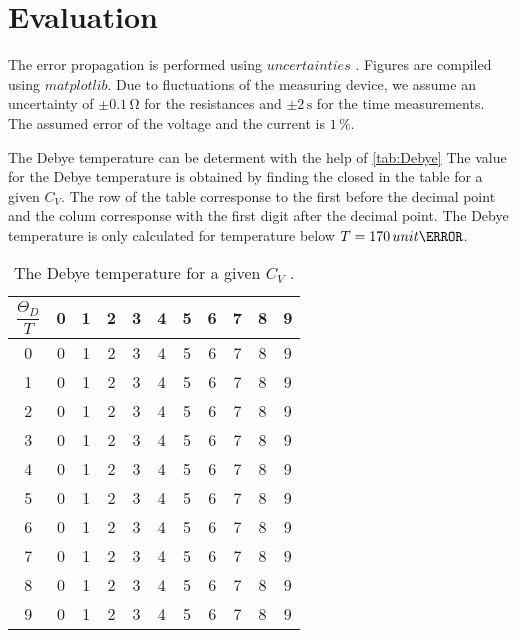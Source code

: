 \section{Evaluation}
\label{sec:Auswertung}



The error propagation is performed using $uncertainties$ \cite{unp}.
Figures are compiled using $matplotlib$\cite{Hunter:2007}. Due to fluctuations of the measuring device, we assume an uncertainty of
$\pm 0.1 \, \unit{\ohm}$ for the resistances and $\pm 2 \, \unit{\second} $ for the time measurements. 
The assumed error of the voltage and the current is $1 \, \%$.



The Debye temperature can be determent with the help of \autoref{tab:Debye}
The value for the Debye temperature is obtained by finding the closed in the table for a given $C_V$.
The row of the table corresponse  to the first before the decimal point and the colum corresponse
with the first digit after the decimal point. 
The Debye temperature is only calculated for temperature below $T = 170 \, unit{\kelvin}$.

\begin{table}[H]
\centering
\caption{The Debye temperature for a given $C_V$  \cite{v47}.}
\label{tab:Debye}
\begin{tabular}{c | c c c c c c c c c c}
\toprule
 $\dfrac{\Theta_D}{T} $ &0 & 1 & 2 &3 & 4 & 5&6 & 7 & 8 &9\\
\midrule
    0 & 0 & 1 & 2 & 3 & 4 & 5 & 6 & 7 & 8 & 9 \\
    1 & 0 & 1 & 2 & 3 & 4 & 5 & 6 & 7 & 8 & 9 \\
    2 & 0 & 1 & 2 & 3 & 4 & 5 & 6 & 7 & 8 & 9 \\
    3 & 0 & 1 & 2 & 3 & 4 & 5 & 6 & 7 & 8 & 9 \\
    4 & 0 & 1 & 2 & 3 & 4 & 5 & 6 & 7 & 8 & 9 \\
    5 & 0 & 1 & 2 & 3 & 4 & 5 & 6 & 7 & 8 & 9 \\
    6 & 0 & 1 & 2 & 3 & 4 & 5 & 6 & 7 & 8 & 9 \\
    7 & 0 & 1 & 2 & 3 & 4 & 5 & 6 & 7 & 8 & 9 \\
    8 & 0 & 1 & 2 & 3 & 4 & 5 & 6 & 7 & 8 & 9 \\
    9 & 0 & 1 & 2 & 3 & 4 & 5 & 6 & 7 & 8 & 9 \\
\bottomrule
\end{tabular}
\end{table}